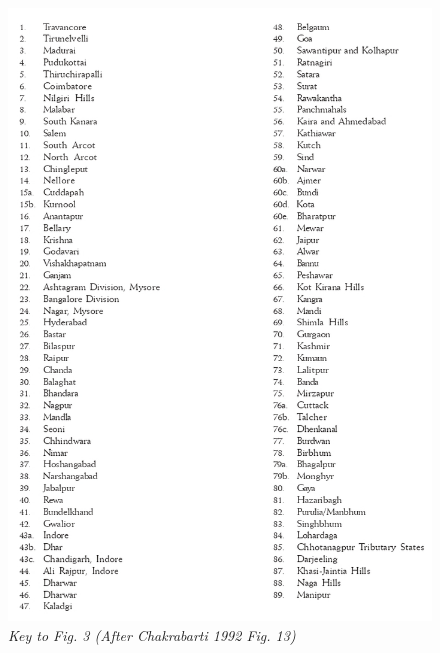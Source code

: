 \begin{figure}[H]
\includegraphics[scale=.7]{images/chapter-1/fig003a.jpg}
\caption*{\textit{Key to Fig. 3 (After Chakrabarti 1992 Fig. 13)}}\label{chapter1-fig003a}
\end{figure}

\newpage



